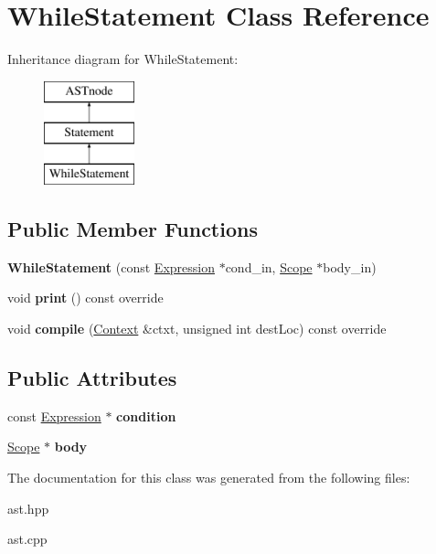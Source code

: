 \hypertarget{class_while_statement}{}\section{While\+Statement Class Reference}
\label{class_while_statement}
Inheritance diagram for While\+Statement\+:\begin{figure}[H]
\begin{center}
\leavevmode
\includegraphics[height=3.000000cm]{class_while_statement}
\end{center}
\end{figure}
\subsection*{Public Member Functions}
\begin{DoxyCompactItemize}
\item 
\mbox{\label{class_while_statement_a7900c38944115fd7ba2452d0f2e73b1c}} 
{\bfseries While\+Statement} (const \hyperlink{class_expression}{Expression} $\ast$cond\+\_\+in, \hyperlink{class_scope}{Scope} $\ast$body\+\_\+in)
\item 
\mbox{\label{class_while_statement_afa5b82ee367e5bf02961c057649956e1}} 
void {\bfseries print} () const override
\item 
\mbox{\label{class_while_statement_ab4c3557af0eec74c6c3ae69b98435a9a}} 
void {\bfseries compile} (\hyperlink{class_context}{Context} \&ctxt, unsigned int dest\+Loc) const override
\end{DoxyCompactItemize}
\subsection*{Public Attributes}
\begin{DoxyCompactItemize}
\item 
\mbox{\label{class_while_statement_a5ae7976e8c7cf064385a05abc441c94e}} 
const \hyperlink{class_expression}{Expression} $\ast$ {\bfseries condition}
\item 
\mbox{\label{class_while_statement_a3abdc30265556f0a7e801a0c5fdcee03}} 
\hyperlink{class_scope}{Scope} $\ast$ {\bfseries body}
\end{DoxyCompactItemize}


The documentation for this class was generated from the following files\+:\begin{DoxyCompactItemize}
\item 
ast.\+hpp\item 
ast.\+cpp\end{DoxyCompactItemize}
